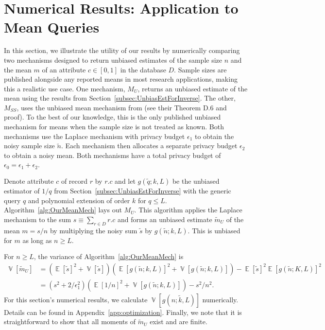 \documentclass[11pt]{article}
\newcommand{\E}{\operatorname{\mathbb{E}}}
\newcommand{\V}{\operatorname{\mathbb{V}}}
\begin{document}
\section{Numerical Results: Application to Mean Queries}
\label{sec:Numerical_Means}

In this section, we illustrate the utility of our results by numerically comparing two mechanisms designed to return unbiased estimates of the sample size $n$ and the mean $m$ of an attribute $c \in [0,1]$ in the database $D$. Sample sizes are published alongside any reported means in most research applications, making this a realistic use case. One mechanism, $M_U$, returns an unbiased estimate of the mean using the results from Section~\ref{subsec:UnbiasEstForInverse}. The other, $M_{SS}$, uses the unbiased mean mechanism from \cite{KamathEtAl2023Trilemma} (see their Theorem D.6 and proof). To the best of our knowledge, this is the only published unbiased mechanism for means when the sample size is not treated as known. Both mechanisms use the Laplace mechanism with privacy budget $\epsilon_1$ to obtain the noisy sample size $\tilde{n}$. Each mechanism then allocates a separate privacy budget $\epsilon_2$ to obtain a noisy mean. Both mechanisms have a total privacy budget of $\epsilon_0 = \epsilon_1 + \epsilon_2$.

Denote attribute $c$ of record $r$ by $r.c$ and let $g(\tilde{q};k,L)$ be the unbiased estimator of $1/q$ from Section~\ref{subsec:UnbiasEstForInverse} with the generic query $q$ and polynomial extension of order $k$ for $q \leq L$. Algorithm~\ref{alg:OurMeanMech} lays out $M_U$. This algorithm applies the Laplace mechanism to the sum $s \equiv \sum_{r \in D} r.c$ and forms an unbiased estimate $\tilde{m}_U$ of the mean $m = s/n$ by multiplying the noisy sum $\tilde{s}$ by $g(\tilde{n};k,L)$. This is unbiased for $m$ as long as $n \geq L$.

For $n \geq L$, the variance of Algorithm~\ref{alg:OurMeanMech} is 
\begin{align}
    \V[\tilde{m}_U] &= (\E[\tilde{s}]^2 + \V[\tilde{s}])(\E[g(\tilde{n};k,L)]^2 + \V[g(\tilde{n};k,L)]) - \E[\tilde{s}]^2\E[g(\tilde{n};K,L)]^2 \\
    &= (s^2 + 2/\epsilon_1^2)(\E[1/n]^2 + \V[g(\tilde{n};k,L)]) - s^2/n^2.
\end{align}
For this section's numerical results, we calculate $\V[g(\tilde{n;k,L})]$ numerically. Details can be found in Appendix~\ref{app:optimization}. Finally, we note that it is straightforward to show that all moments of $\tilde{m}_U$ exist and are finite.
\end{document}
